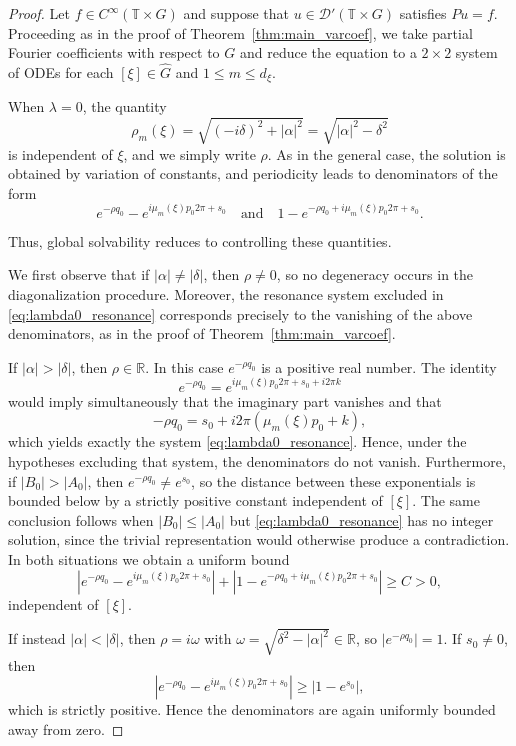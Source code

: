 \documentclass[10pt,a4paper]{amsart}
\begin{document}
	\begin{proof}
		Let $f \in C^\infty(\mathbb{T} \times G)$ and suppose that 
		$u \in \mathcal{D}'(\mathbb{T} \times G)$ satisfies $Pu=f$. 
		Proceeding as in the proof of Theorem~\ref{thm:main_varcoef}, 
		we take partial Fourier coefficients with respect to $G$ and 
		reduce the equation to a $2\times2$ system of ODEs for each 
		$[\xi] \in \widehat G$ and $1 \le m \le d_\xi$.
		
		When $\lambda=0$, the quantity
		\[
		\rho_m(\xi)=\sqrt{(-i\delta)^2+|\alpha|^2}
		=\sqrt{|\alpha|^2-\delta^2}
		\]
		is independent of $\xi$, and we simply write $\rho$.
		As in the general case, the solution is obtained by variation of constants,
		and periodicity leads to denominators of the form
		\[
		e^{-\rho q_0}-e^{i\mu_m(\xi)p_0 2\pi+s_0}
		\quad\text{and}\quad
		1-e^{-\rho q_0+i\mu_m(\xi)p_0 2\pi+s_0}.
		\]
		
		Thus, global solvability reduces to controlling these quantities.
		
		We first observe that if $|\alpha| \ne |\delta|$, then $\rho \ne 0$,
		so no degeneracy occurs in the diagonalization procedure.
		Moreover, the resonance system excluded in
		\eqref{eq:lambda0_resonance} corresponds precisely to the
		vanishing of the above denominators, as in the proof of
		Theorem~\ref{thm:main_varcoef}.
		
		If $|\alpha|>|\delta|$, then $\rho\in\mathbb R$.
		In this case $e^{-\rho q_0}$ is a positive real number.
		The identity
		\[
		e^{-\rho q_0}=e^{i\mu_m(\xi)p_0 2\pi+s_0+i2\pi k}
		\]
		would imply simultaneously that the imaginary part vanishes
		and that
		\[
		-\rho q_0 = s_0 + i2\pi(\mu_m(\xi)p_0+k),
		\]
		which yields exactly the system \eqref{eq:lambda0_resonance}.
		Hence, under the hypotheses excluding that system,
		the denominators do not vanish.
		Furthermore, if $|B_0|>|A_0|$, then
		$e^{-\rho q_0}\neq e^{s_0}$,
		so the distance between these exponentials is bounded below by
		a strictly positive constant independent of $[\xi]$.
		The same conclusion follows when $|B_0|\le |A_0|$ but
		\eqref{eq:lambda0_resonance} has no integer solution,
		since the trivial representation would otherwise produce a contradiction.
		In both situations we obtain a uniform bound
		\[
		\left|e^{-\rho q_0}-e^{i\mu_m(\xi)p_0 2\pi+s_0}\right|
		+
		\left|1-e^{-\rho q_0+i\mu_m(\xi)p_0 2\pi+s_0}\right|
		\ge C>0,
		\]
		independent of $[\xi]$.
		
		If instead $|\alpha|<|\delta|$, then $\rho=i\omega$ with
		$\omega=\sqrt{\delta^2-|\alpha|^2}\in\mathbb R$,
		so $|e^{-\rho q_0}|=1$.
		If $s_0\neq0$, then
		\[
		|e^{-\rho q_0}-e^{i\mu_m(\xi)p_0 2\pi+s_0}|
		\ge |1-e^{s_0}|,
		\]
		which is strictly positive.
		Hence the denominators are again uniformly bounded away from zero.
		

\end{proof}
\end{document}
